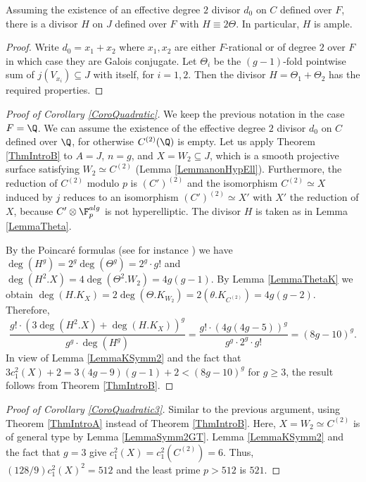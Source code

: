 \begin{lemma}
\notready\label{LemmaTheta} Assuming the existence of an effective degree $2$ divisor $d_0$ on $C$ defined over $F$, there is a divisor $H$ on $J$ defined over $F$ with $H\equiv 2\Theta$. In particular, $H$ is ample.
\end{lemma}
\begin{proof} Write $d_0=x_1+x_2$ where $x_1,x_2$ are either $F$-rational or of degree $2$ over $F$ in which case they are Galois conjugate. Let $\Theta_i$ be the $(g-1)$-fold pointwise sum of $j(V_{x_i})\subseteq J$ with itself, for $i=1,2$. Then the divisor $H=\Theta_1+\Theta_2$ has the required properties.
\end{proof}


\begin{proof}[Proof of Corollary \ref{CoroQuadratic}] We keep the previous notation in the case $F=\Q$. We can assume the existence of the effective degree $2$ divisor $d_0$ on $C$ defined over $\Q$, for otherwise $C^{(2)}(\Q)$ is empty. Let us apply Theorem \ref{ThmIntroB} to $A=J$, $n=g$,  and $X=W_2\subseteq J$, which is a smooth projective surface satisfying $W_2\simeq C^{(2)}$ (Lemma \ref{LemmanonHypEll}). Furthermore, the reduction of $C^{(2)}$ modulo $p$ is $(C')^{(2)}$ and the isomorphism $C^{(2)}\simeq X$ induced by $j$ reduces to an isomorphism $(C')^{(2)}\simeq X'$ with $X'$ the reduction of $X$, because $C'\otimes \F_p^{alg}$ is not hyperelliptic. The divisor $H$ is taken as in Lemma \ref{LemmaTheta}.

By the Poincar\'e formulas (see for instance \cite{KouvidakisTAMS93}) we have $\deg(H^g)=2^g\deg(\Theta^g)=2^g\cdot g!$ and $\deg(H^2.X)=4\deg(\Theta^2.W_2)=4g(g-1)$. By Lemma \ref{LemmaThetaK} we obtain $\deg(H.K_X)=2\deg(\Theta.K_{W_2})=2 (\theta.K_{C^{(2)}})=4g(g-2)$. Therefore,
$$
\frac{g!\cdot (3\deg(H^{2}.X) + \deg(H.K_X))^g}{g^g\cdot \deg(H^g)} = \frac{g!\cdot (4g(4g-5))^g}{g^g\cdot 2^g\cdot g!}=(8g-10)^g.
$$
In view of Lemma \ref{LemmaKSymm2} and the fact that $3c_1^2(X)+2=3(4g-9)(g-1)+2<(8g-10)^g$ for $g\ge 3$, the result follows from Theorem \ref{ThmIntroB}.
\end{proof}

\begin{proof}[Proof of Corollary \ref{CoroQuadratic3}] Similar to the previous argument, using Theorem \ref{ThmIntroA} instead of Theorem \ref{ThmIntroB}. Here, $X=W_2\simeq C^{(2)}$ is of general type by Lemma \ref{LemmaSymm2GT}. Lemma \ref{LemmaKSymm2} and the fact that $g=3$ give $c_1^2(X)=c_1^2(C^{(2)})=6$. Thus, $(128/9)c_1^2(X)^2= 512$ and the least prime $p>512$ is $521$.
\end{proof}

